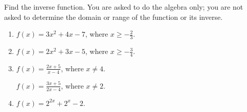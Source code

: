 Find the inverse function. You are asked to do the algebra only; you are not asked to determine the domain or range of the function or its inverse. 
\begin{enumerate}[ref={\fcProblemRef}]
\item $f(x)= 3x^2+4x-7$, where $x\geq -\frac{2}{3}$.

\item $f(x)= 2x^2+3x-5$, where $x\geq -\frac{3}{4}$.

\item $f(x)= \frac{2x+5}{x-4}$, where $x\neq 4$.

 \label{problemFindInversef=(3x+5)/(2x-4)} $f(x)= \frac{3x+5}{2x-4}$, where $x\neq 2$.



\item $f(x)=2^{2x}+2^{x}-2$.

\end{enumerate}
